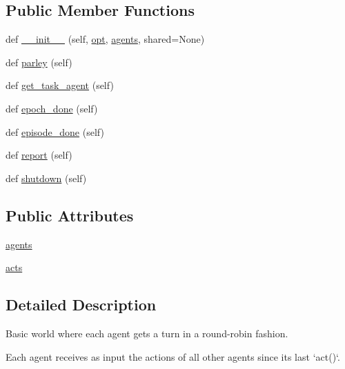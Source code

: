 \subsection*{Public Member Functions}
\begin{DoxyCompactItemize}
\item 
def \hyperlink{classparlai_1_1core_1_1worlds_1_1MultiAgentDialogWorld_a228cc89020ff34ec71bed43fd5115941}{\+\_\+\+\_\+init\+\_\+\+\_\+} (self, \hyperlink{classparlai_1_1core_1_1worlds_1_1World_a3640d92718acd3e6942a28c1ab3678bd}{opt}, \hyperlink{classparlai_1_1core_1_1worlds_1_1MultiAgentDialogWorld_a05fc93525cb86edef121980fc55f9926}{agents}, shared=None)
\item 
def \hyperlink{classparlai_1_1core_1_1worlds_1_1MultiAgentDialogWorld_a2b41d3026bc5afa04e7f874ba097b721}{parley} (self)
\item 
def \hyperlink{classparlai_1_1core_1_1worlds_1_1MultiAgentDialogWorld_a58ea065f63c441f27c97b6cb649ccf53}{get\+\_\+task\+\_\+agent} (self)
\item 
def \hyperlink{classparlai_1_1core_1_1worlds_1_1MultiAgentDialogWorld_ade057311db0368be26ac8b196619b862}{epoch\+\_\+done} (self)
\item 
def \hyperlink{classparlai_1_1core_1_1worlds_1_1MultiAgentDialogWorld_a341fb4b45fd697d9b0978cb1ed1b26d2}{episode\+\_\+done} (self)
\item 
def \hyperlink{classparlai_1_1core_1_1worlds_1_1MultiAgentDialogWorld_a686b237998ede0e9431dd58bca2b34c1}{report} (self)
\item 
def \hyperlink{classparlai_1_1core_1_1worlds_1_1MultiAgentDialogWorld_a02b4cbd9d41fde087fb4f0b11d6479a5}{shutdown} (self)
\end{DoxyCompactItemize}
\subsection*{Public Attributes}
\begin{DoxyCompactItemize}
\item 
\hyperlink{classparlai_1_1core_1_1worlds_1_1MultiAgentDialogWorld_a05fc93525cb86edef121980fc55f9926}{agents}
\item 
\hyperlink{classparlai_1_1core_1_1worlds_1_1MultiAgentDialogWorld_a99b292b010250515b1690aeb03cf614b}{acts}
\end{DoxyCompactItemize}


\subsection{Detailed Description}
\begin{DoxyVerb}Basic world where each agent gets a turn in a round-robin fashion.

Each agent receives as input the actions of all other agents since its last `act()`.
\end{DoxyVerb}
 

